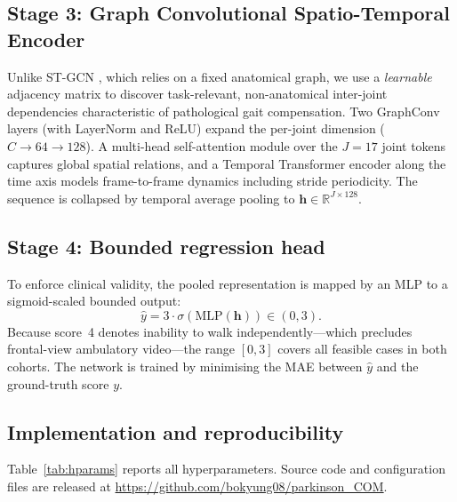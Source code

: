 \documentclass[preprint,12pt]{elsarticle}
\begin{document}
\subsection{Stage 3: Graph Convolutional Spatio-Temporal Encoder}
\label{sec:stage3}
Unlike ST-GCN \cite{yan2018spatial}, which relies on a fixed anatomical graph,
we use a \emph{learnable} adjacency matrix \cite{shi2019twoStream} to discover
task-relevant, non-anatomical inter-joint dependencies characteristic of
pathological gait compensation. Two GraphConv layers (with LayerNorm and ReLU)
expand the per-joint dimension ($C\!\to\!64\!\to\!128$). A multi-head
self-attention module over the $J=17$ joint tokens captures global spatial
relations, and a Temporal Transformer encoder along the time axis models
frame-to-frame dynamics including stride periodicity. The sequence is collapsed
by temporal average pooling to $\mathbf{h}\in\mathbb{R}^{J\times128}$.

\subsection{Stage 4: Bounded regression head}
\label{sec:stage4}
To enforce clinical validity, the pooled representation is mapped by an MLP to a
sigmoid-scaled bounded output:
\begin{equation}
\hat{y}=3\cdot\sigma\!\left(\mathrm{MLP}(\mathbf{h})\right)\in(0,3).
\label{eq:bounded}
\end{equation}
Because score~4 denotes inability to walk independently---which precludes
frontal-view ambulatory video---the range $[0,3]$ covers all feasible cases in
both cohorts. The network is trained by minimising the MAE between $\hat{y}$ and
the ground-truth score $y$.

\subsection{Implementation and reproducibility}
\label{sec:repro}
Table~\ref{tab:hparams} reports all hyperparameters. Source code and
configuration files are released at
\url{https://github.com/bokyung08/parkinson_COM}.
\end{document}
